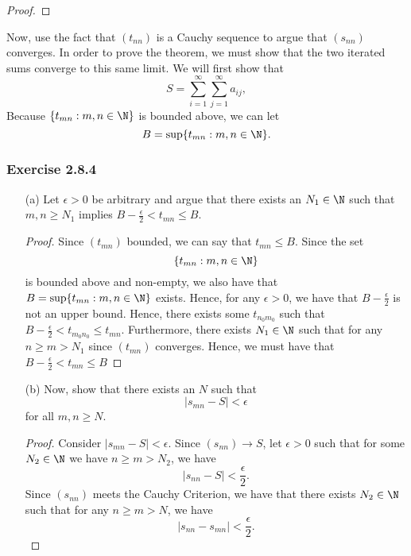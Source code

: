 \begin{enumerate}
\begin{proof}
        \end{proof}

    Now, use the fact that \( (t_{nn})\) is a Cauchy sequence to argue that \( (s_{nn})\) converges. In order to prove the theorem, we must show that the two iterated sums converge to this same limit. We will first show that 
        \[ S = \sum_{ i=1 }^{ \infty  } \sum_{ j=1 }^{ \infty  } a_{ij}, \] 
        Because \( \{ t_{mn} : m,n \in \N  \} \) is bounded above, we can let 
        \[ B = \sup \{ t_{mn}: m,n \in \N  \}.\] 
        \subsubsection{Exercise 2.8.4}     
        \begin{enumerate}
            \item[(a)] Let \( \epsilon > 0  \) be arbitrary and argue that there exists an \(  N_1 \in \N  \) such that \( m,n \geq  N_1 \) implies \( B - \frac{ \epsilon  }{ 2 } < t_{mn} \leq  B.\)
                \begin{proof}
                    Since \( (t_{mn}) \) bounded, we can say that \( t_{mn} \leq B \). Since the set 
                    \[  \{ t_{mn} : m,n \in \N \}  \]
                    is bounded above and non-empty, we also have that 
                    \( B = \sup \{ t_{mn}: m,n \in \N  \}  \) exists. Hence, for any \( \epsilon > 0  \), we have that \( B - \frac{ \epsilon  }{ 2 }  \) is not an upper bound. Hence, there exists some \( t_{n_0 m_0} \) such that \( B - \frac{ \epsilon  }{ 2 } < t_{m_0 n_0} \leq t_{mn}\). Furthermore, there exists \( N_1 \in \N  \) such that for any \(  n \geq m > N_1  \) since \( (t_{mn}) \) converges. Hence,  we must have that 
                    \( B - \frac{ \epsilon  }{ 2 } < t_{mn} \leq B \)
                \end{proof}
            \item[(b)] Now, show that there exists an \( N  \) such that 
            \[ | s_{mn} - S  | < \epsilon \]
            for all \( m,n \geq N \).
            \begin{proof}
                Consider \(  | s_{mn} - S  | < \epsilon \). Since \(  (s_{nn}) \to S  \), let \( \epsilon > 0  \) such that for some \( N_2 \in \N  \) we have \( n \geq m > N_2  \), we have
                \[ | s_{nn} - S  | < \frac{ \epsilon  }{ 2 } . \]
                Since \( (s_{nn}) \) meets the Cauchy Criterion, we have that there exists \( N_2 \in \N  \) such that for any \( n \geq m > N  \), we have 
                \[ | s_{nn} - s_{mn} | < \frac{ \epsilon  }{ 2 }.   \]

\end{proof}
\end{enumerate}
\end{enumerate}
